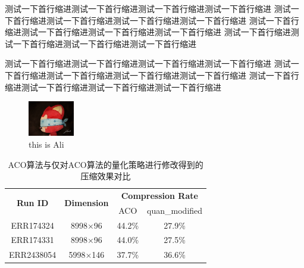 \documentclass{article}
\begin{document}
	测试一下首行缩进测试一下首行缩进测试一下首行缩进测试一下首行缩进
	测试一下首行缩进测试一下首行缩进测试一下首行缩进测试一下首行缩进
	测试一下首行缩进测试一下首行缩进测试一下首行缩进测试一下首行缩进
	测试一下首行缩进测试一下首行缩进测试一下首行缩进测试一下首行缩进

	测试一下首行缩进测试一下首行缩进测试一下首行缩进测试一下首行缩进
	测试一下首行缩进测试一下首行缩进测试一下首行缩进测试一下首行缩进
	测试一下首行缩进测试一下首行缩进测试一下首行缩进测试一下首行缩进

	\begin{figure}[hbt]
		\centering
		\includegraphics[width=2cm]{Ali.jpg}
		\caption{this is Ali}
	\end{figure}

	\begin{table}[htbp]
		\centering
		\caption{ACO算法与仅对ACO算法的量化策略进行修改得到的压缩效果对比}
		\begin{tabular}{cccc}
		\cline{1-4} %
		\multirow{2}{*}{\textbf{Run ID}} & \multirow{2}{*}{\textbf{Dimension}}     & \multicolumn{2}{c}{\textbf{Compression Rate}} \\
						  &                       &   ACO        &   quan\_modified       \\ \cline{1-4}
			 ERR174324             & \multicolumn{1}{c|}{8998$\times$96} &   44.2\%        &    27.9\%      \\
			   ERR174331           & \multicolumn{1}{c|}{8998$\times$96} &    44.0\%       &   27.5\%       \\
			   ERR2438054          & \multicolumn{1}{c|}{5998$\times$146} &     37.7\%      &   36.6\%       \\ \cline{1-4}
		\end{tabular}
	\end{table}
\end{document}
